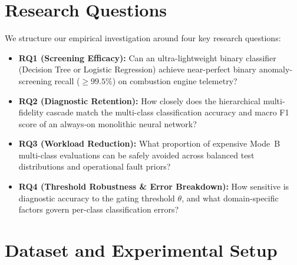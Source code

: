 \documentclass[journal]{IEEEtran}
\begin{document}
\section{Research Questions}
We structure our empirical investigation around four key research questions:
\begin{itemize}
    \item \textbf{RQ1 (Screening Efficacy):} Can an ultra-lightweight binary classifier (Decision Tree or Logistic Regression) achieve near-perfect binary anomaly-screening recall ($\ge 99.5\%$) on combustion engine telemetry?
    \item \textbf{RQ2 (Diagnostic Retention):} How closely does the hierarchical multi-fidelity cascade match the multi-class classification accuracy and macro F1 score of an always-on monolithic neural network?
    \item \textbf{RQ3 (Workload Reduction):} What proportion of expensive Mode~B multi-class evaluations can be safely avoided across balanced test distributions and operational fault priors?
    \item \textbf{RQ4 (Threshold Robustness \& Error Breakdown):} How sensitive is diagnostic accuracy to the gating threshold $\theta$, and what domain-specific factors govern per-class classification errors?
\end{itemize}

\section{Dataset and Experimental Setup}

\begin{table}[t]
\centering
\caption{EngineFaultDB Class Distribution and Partitioning}
\label{tab:dataset}
\end{table}
\end{document}
